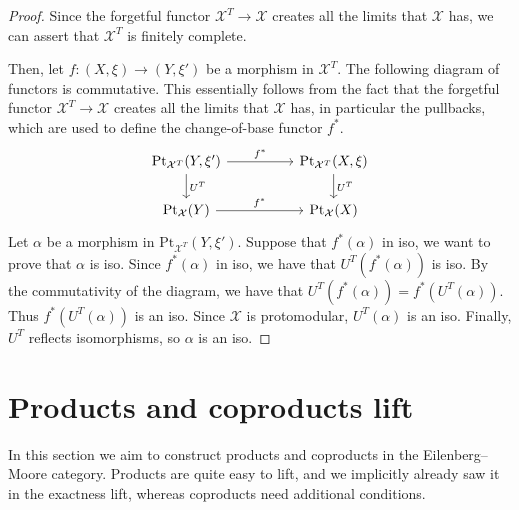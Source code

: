\begin{subbox}{}
    \begin{proof}
        Since the forgetful functor $\mathcal{X}^T \to \mathcal{X}$ creates all the limits that $\mathcal{X}$ has, we can assert that $\mathcal{X}^T$ is finitely complete.

        Then, let $f:(X,\xi) \to (Y,\xi')$ be a morphism in $\mathcal{X}^T$. The following diagram of functors is commutative. This essentially follows from the fact that the forgetful functor $\mathcal{X}^T \to \mathcal{X}$ creates all the limits that $\mathcal{X}$ has, in particular the pullbacks, which are used to define the change-of-base functor $f^*$.
        \[
\begin{tikzcd}
    {\mathrm{Pt}_{\mathcal{X}^T}(Y,\xi')} \arrow[rr, "f^*"] \arrow[d, "U^T"] &  & {\mathrm{Pt}_{\mathcal{X}^T}(X,\xi)} \arrow[d, "U^T"] \\
    \mathrm{Pt}_{\mathcal{X}}(Y) \arrow[rr, "f^*"]                           &  & \mathrm{Pt}_{\mathcal{X}}(X)                         
    \end{tikzcd}
    \]
    Let $\alpha$ be a morphism in $\mathrm{Pt}_{\mathcal{X}^T}(Y,\xi')$. Suppose that $f^*(\alpha)$ in iso, we want to prove that $\alpha$ is iso. Since $f^*(\alpha)$ in iso, we have that $U^T(f^*(\alpha))$ is iso. By the commutativity of the diagram, we have that $U^T(f^*(\alpha)) = f^*(U^T(\alpha))$. Thus $f^*(U^T(\alpha))$ is an iso. Since $\mathcal{X}$ is protomodular, $U^T(\alpha)$ is an iso. Finally, $U^T$ reflects isomorphisms, so $\alpha$ is an iso.
    \end{proof}
\end{subbox}

\section{Products and coproducts lift}

In this section we aim to construct products and coproducts in the Eilenberg–Moore category. Products are quite easy to lift, and we implicitly already saw it in the exactness lift, whereas coproducts need additional conditions.
 
